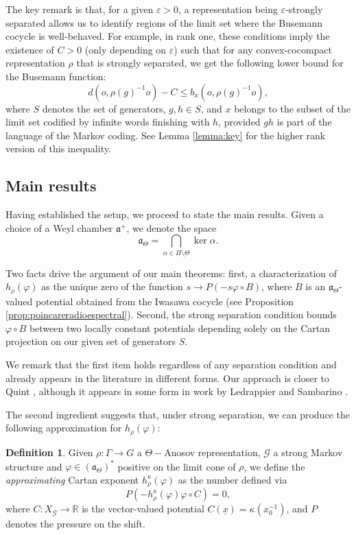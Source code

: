 \documentclass{amsart}
\theoremstyle{remark}
\theoremstyle{definition}
\newtheorem*{defi*}{Definition}
\begin{document}
The key remark is that, for a given $\varepsilon > 0$, a representation being $\varepsilon$-strongly separated allows us to identify regions of the limit set where the Busemann cocycle is well-behaved.
For example, in rank one, these conditions imply the existence of $C>0$ (only depending on $\varepsilon$) such that for any convex-cocompact representation $\rho$ that is strongly separated, we get the following lower bound for the Busemann function:
$$d(o,\rho(g)^{-1}o) - C \leq b_x (o,\rho(g)^{-1}o),$$
where $S$ denotes the set of generators, $g, h \in S$, and $x$ belongs to the subset of the limit set codified by infinite words finishing with $h$, provided $gh$ is part of the language of the Markov coding.
See Lemma \ref{lemma:key} for the higher rank version of this inequality.



\subsection{Main results}
Having established the setup, we proceed to state the main results.
Given a choice of a Weyl chamber $\mathfrak{a}^+$, we denote the space
$$\mathfrak{a}_\Theta = \bigcap_{\alpha \in \Pi \setminus \Theta} \ker \alpha.$$

Two facts drive the argument of our main theorems: 
first, a characterization of $h_\rho (\varphi)$ as the unique zero of the function $s \to P(- s \varphi \circ B)$, where $B$ is an $\mathfrak{a}_\Theta$-valued potential obtained from the Iwasawa cocycle (see Proposition \ref{prop:poincareradioespectral}).
Second, the strong separation condition bounds $\varphi \circ B$ between two locally constant potentials depending solely on the Cartan projection on our given set of generators $S$.

We remark that the first item holds regardless of any separation condition and already appears in the literature in different forms. 
Our approach is closer to Quint \cite{quint2003indicateur}, although it appears in some form in work by Ledrappier \cite{ledrappier1994structure} and Sambarino \cite{sambarino2014hyperconvex}.

The second ingredient suggests that, under strong separation, we can produce the following approximation for $h_\rho (\varphi)$:

\begin{defi*}
 Given $\rho: \Gamma \rightarrow G$ a $\Theta-$Anosov representation, $\mathcal{G}$ a strong Markov structure and $\varphi \in (\mathfrak{a}_\Theta)^*$ positive on the limit cone of $\rho$, we define the \emph{approximating} Cartan exponent $h_\rho^\kappa (\varphi)$ as the number defined via
    $$P(- h_\rho^\kappa (\varphi) \varphi \circ C) =0,$$
 where $C : X_\mathcal{G} \rightarrow \mathbb{R}$ is the vector-valued potential $C(\underline{x}) = \kappa (x_0^{-1})$, and $P$ denotes the pressure on the shift.
\end{defi*}
\end{document}
